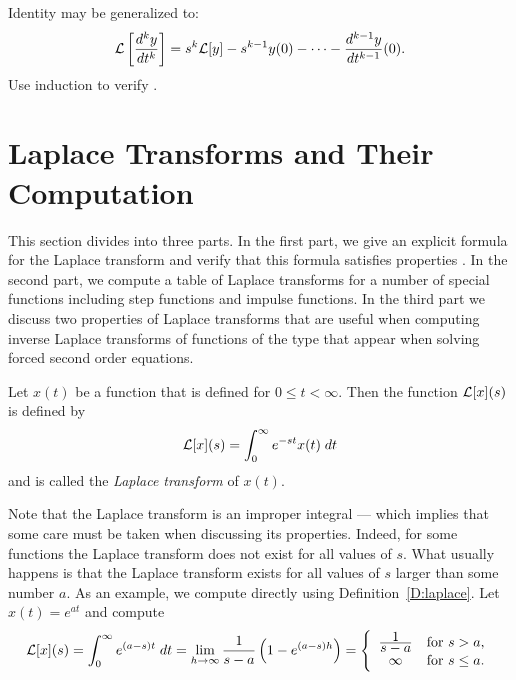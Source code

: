 \documentclass{ximera}
\begin{document}
\begin{exercise}   \label{exer:kderLap}
Identity  may be 
generalized to: 
\begin{equation}  \label{LapDerk}
{\cal L}\left[\frac{d^k y}{dt^k}\right] =
s^k{\cal L}[y] - s^{k-1} y(0) - \cdots - \frac{d^{k-1} y}{dt^{k-1}}(0).
\end{equation}
Use induction to verify . 
\end{exercise}


\section{Laplace Transforms and Their Computation} \label{S:13.3}

This section divides into three parts.  In the first part, we give an explicit 
formula for the Laplace transform and verify that this formula satisfies 
properties .  In the second part, we compute a table of Laplace
transforms for a number of special functions including step functions and
impulse functions.  In the third part we discuss two properties of Laplace
transforms that are useful when computing inverse Laplace transforms of
functions of the type that appear when solving forced second order equations.

\begin{Def}  \label{D:laplace}
Let $x(t)$ be a function that is defined for $0\le t < \infty$.
Then the function ${\cal L}[x](s)$ is defined by
\begin{equation} \label{E:laplace}
{\cal L}[x](s) = \int_0^{\infty} e^{-st} x(t)\; dt
\end{equation}
and is called the {\em Laplace transform\/} of $x(t)$.
\end{Def}

Note that the Laplace transform is an improper 
integral --- which implies that some care must be taken when discussing 
its properties.  Indeed, for some functions the Laplace transform does 
not exist for all values of $s$.  What usually happens is that 
the Laplace transform exists for all values of $s$ larger than some 
number $a$.  As an example, we compute  directly using 
Definition~\ref{D:laplace}.  Let $x(t)=e^{at}$ and compute 
\begin{equation}  \label{e:expat}
{\cal L}[x](s) = \int_0^{\infty} e^{(a-s)t}\; dt=
\lim\limits_{h\to \infty} \frac{1}{s-a}\left( 1-e^{(a-s)h} \right)
=\left\{ \begin{array}{cl} \frac{\displaystyle 1}{\displaystyle s-a} & \mbox{for $s>a$,}\\
\infty & \mbox{for $s\le a$.}\end{array}\right.
\end{equation}
\end{document}
